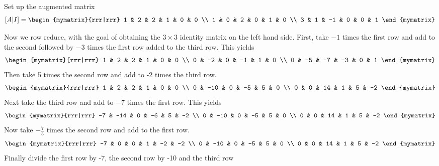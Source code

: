 \begin{solution} Set up the augmented matrix
\begin{equation*}
\mat{A|I} =  
\begin{mymatrix}{rrr|rrr}
1 & 2 & 2 & 1 & 0 & 0 \\
1 & 0 & 2 & 0 & 1 & 0 \\
3 & 1 & -1 & 0 & 0 & 1
\end{mymatrix}
\end{equation*}

Now we row reduce, with the goal of obtaining the $3 \times 3$ identity matrix on the left hand side.
First, take $-1 $ times the first row and add to the second
followed by $-3 $ times the first row added to the third row. This
yields
\begin{equation*}
\allowbreak \begin{mymatrix}{rrr|rrr}
1 & 2 & 2 & 1 & 0 & 0 \\
0 & -2 & 0 & -1 & 1 & 0 \\
0 & -5 & -7 & -3 & 0 & 1
\end{mymatrix} 
\end{equation*}
Then take 5 times the second row and add to -2 times the third row.
\begin{equation*}
\begin{mymatrix}{rrr|rrr}
1 & 2 & 2 & 1 & 0 & 0 \\
0 & -10 & 0 & -5 & 5 & 0 \\
0 & 0 & 14 & 1 & 5 & -2
\end{mymatrix}
\end{equation*}
Next take the third row and add to $ -7$ times the first row.
This yields
\begin{equation*}
\begin{mymatrix}{rrr|rrr}
-7 & -14 & 0 & -6 & 5 & -2 \\
0 & -10 & 0 & -5 & 5 & 0 \\
0 & 0 & 14 & 1 & 5 & -2
\end{mymatrix} 
\end{equation*}
Now take $ -\frac{7}{5}$ times the second row and add to the first row.
\begin{equation*}
 \begin{mymatrix}{rrr|rrr}
-7 & 0 & 0 & 1 & -2 & -2 \\
0 & -10 & 0 & -5 & 5 & 0 \\
0 & 0 & 14 & 1 & 5 & -2
\end{mymatrix} 
\end{equation*}
Finally divide the first row by -7, the second row by -10 and the third row

\end{solution}
